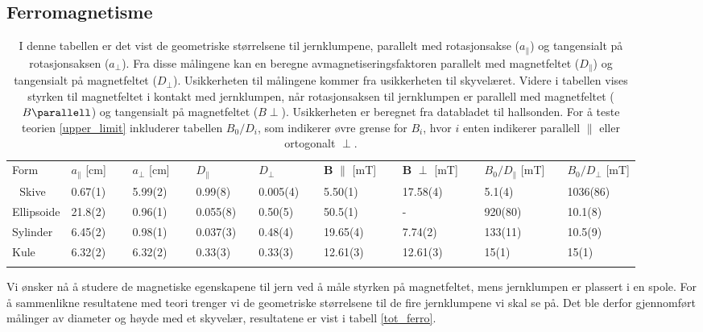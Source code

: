 \documentclass[%
 reprint,
 amsmath,amssymb,
 aps,
 norsk,
]{revtex4-1}
\begin{document}
\subsection{Ferromagnetisme}
\begin{table}\renewcommand{\arraystretch}{1.2}
\centering
\caption{I denne tabellen er det vist de geometriske størrelsene til jernklumpene, parallelt med rotasjonsakse ($a_{\parallel}$) og tangensialt på rotasjonsaksen ($a_{\perp}$). Fra disse målingene kan en beregne avmagnetiseringsfaktoren parallelt med magnetfeltet ($D_{\parallel}$) og tangensialt på magnetfeltet ($D_{\perp}$). Usikkerheten til målingene kommer fra usikkerheten til skyvelæret. Videre i tabellen vises styrken til magnetfeltet i kontakt med jernklumpen, når rotasjonsaksen til jernklumpen er parallell med magnetfeltet ($B\parallell$) og tangensialt på magnetfeltet ($B\perp$). Usikkerheten er beregnet fra databladet til hallsonden. For å teste teorien \eqref{upper_limit} inkluderer tabellen $B_0/D_i$, som indikerer øvre grense for $B_i$, hvor $i$ enten indikerer parallell $\parallel$ eller ortogonalt $\perp$.}
\label{tot_ferro}
\begin{tabular}{@{}lllllllll@{}}
\botrule
Form & $a_{\parallel}$ {[}cm{]} $\quad$  & $a_{\perp}$ {[}cm{]} $\quad$  & $D_{\parallel}$ $\qquad \quad$ & $D_{\perp}$ $\qquad\quad$ &  $\bm{B}$  $\parallel$ {[}mT{]} $\quad$ & $\bm{B}$ $\perp$ {[}mT{]} $\quad$ & $B_0/D_{\parallel}$ [mT]$\quad$  & $B_0/D_{\perp}$ [mT]\\ \colrule 
Skive      & 0.67(1)        & 5.99(2)           & 0.99(8)         & 0.005(4) & 5.50(1)                           & 17.58(4)         &    5.1(4)  &  1036(86)      \\
Ellipsoide & 21.8(2)        & 0.96(1)           & 0.055(8)        & 0.50(5) & 50.5(1)                           & -                &   920(80)    & 10.1(8)       \\
Sylinder   & 6.45(2)        & 0.98(1)           & 0.037(3)        & 0.48(4) & 19.65(4)                          & 7.74(2)          &   133(11)    &10.5(9)           \\
Kule       & 6.32(2)        & 6.32(2)           & 0.33(3)         & 0.33(3) & 12.61(3)            & 12.61(3)                &   15(1)  & 15(1)        \\ \botrule
\end{tabular}
\end{table}
Vi ønsker nå å studere de magnetiske egenskapene til jern ved å måle styrken på magnetfeltet, mens jernklumpen er plassert i en spole. For å sammenlikne resultatene med teori trenger vi de geometriske størrelsene til de fire jernklumpene vi skal se på. Det ble derfor gjennomført målinger av diameter og høyde med et skyvelær, resultatene er vist  i tabell \vref{tot_ferro}.
\end{document}
